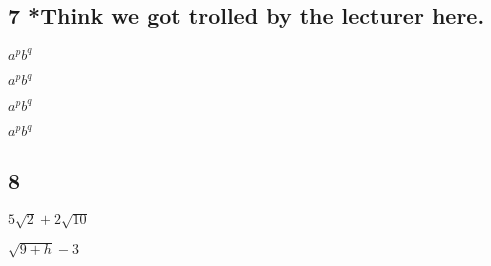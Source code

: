 \documentclass{article}
\begin{document}
\subsection*{7 *Think we got trolled by the lecturer here. }
\begin{enumerate*}
  \item $a^{p}b^{q}$
  \item $a^{p}b^{q}$
  \item $a^{p}b^{q}$
  \item $a^{p}b^{q}$
  
\subsection*{8}
\begin{enumerate*}
   \item $5\sqrt{2}+2\sqrt{10}$
   \item $\sqrt{9+h} - 3$
\end{enumerate*}
  
  
  
\end{enumerate*}
\end{document}
